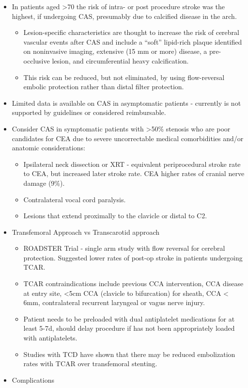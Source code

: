 \documentclass[
]{book}
\providecommand{\tightlist}{%
  \setlength{\itemsep}{0pt}\setlength{\parskip}{0pt}}
\begin{document}
\begin{itemize}
\item
  In patients aged \textgreater70 the risk of intra- or post procedure stroke
  was the highest, if undergoing CAS, presumably due to calcified
  disease in the arch.

  \begin{itemize}
  \item
    Lesion-specific characteristics are thought to increase the risk
    of cerebral vascular events after CAS and include a ``soft''
    lipid-rich plaque identified on noninvasive imaging, extensive
    (15 mm or more) disease, a pre-occlusive lesion, and
    circumferential heavy calcification.
  \item
    This risk can be reduced, but not eliminated, by using
    flow-reversal embolic protection rather than distal filter
    protection.
  \end{itemize}
\item
  Limited data is available on CAS in asymptomatic patients -
  currently is not supported by guidelines or considered reimbursable.
\item
  Consider CAS in symptomatic patients with \textgreater50\% stenosis who are
  poor candidates for CEA due to severe uncorrectable medical
  comorbidities and/or anatomic considerations:

  \begin{itemize}
  \item
    Ipsilateral neck dissection or XRT - equivalent periprocedural
    stroke rate to CEA, but increased later stroke rate. CEA higher
    rates of cranial nerve damage (9\%).
    \citep{giannopoulosRevascularizationRadiationinducedCarotid2018}
  \item
    Contralateral vocal cord paralysis.
  \item
    Lesions that extend proximally to the clavicle or distal to C2.
  \end{itemize}
\item
  Transfemoral Approach vs Transcarotid approach

  \begin{itemize}
  \tightlist
  \item
    ROADSTER Trial - single arm study with flow reversal for
    cerebral protection. Suggested lower rates of post-op stroke in
    patients undergoing TCAR.
  \item
    TCAR contraindications include previous CCA intervention, CCA
    disease at entry site, \textless5cm CCA (clavicle to bifurcation) for
    sheath, CCA \textless{} 6mm, contralateral recurrent laryngeal or vagus
    nerve injury.\citep{kwolek2015}
  \item
    Patient needs to be preloaded with dual antiplatelet medications
    for at least 5-7d, should delay procedure if has not been
    appropriately loaded with antiplatelets.\citep{brott2010, kwolek2015, valls2017}
  \item
    Studies with TCD have shown that there may be reduced
    embolization rates with TCAR over transfemoral
    stenting.\citep{plessers2016}
  \end{itemize}
\item
  Complications


\end{itemize}
\end{document}
